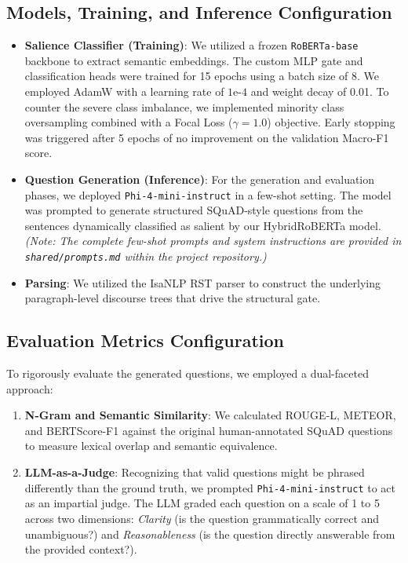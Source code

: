 \documentclass[11pt,a4paper]{article}
\begin{document}
\subsection{Models, Training, and Inference Configuration}
\begin{itemize}
    \item \textbf{Salience Classifier (Training)}: We utilized a frozen \texttt{RoBERTa-base} backbone to extract semantic embeddings. The custom MLP gate and classification heads were trained for 15 epochs using a batch size of 8. We employed AdamW with a learning rate of $1\text{e-}4$ and weight decay of 0.01. To counter the severe class imbalance, we implemented minority class oversampling combined with a Focal Loss ($\gamma=1.0$) objective. Early stopping was triggered after 5 epochs of no improvement on the validation Macro-F1 score.
    \item \textbf{Question Generation (Inference)}: For the generation and evaluation phases, we deployed \texttt{Phi-4-mini-instruct} in a few-shot setting. The model was prompted to generate structured SQuAD-style questions from the sentences dynamically classified as salient by our HybridRoBERTa model. \textit{(Note: The complete few-shot prompts and system instructions are provided in \texttt{shared/prompts.md} within the project repository.)}
    \item \textbf{Parsing}: We utilized the IsaNLP RST parser to construct the underlying paragraph-level discourse trees that drive the structural gate.
\end{itemize}

\subsection{Evaluation Metrics Configuration}
To rigorously evaluate the generated questions, we employed a dual-faceted approach:
\begin{enumerate}
    \item \textbf{N-Gram and Semantic Similarity}: We calculated ROUGE-L, METEOR, and BERTScore-F1 against the original human-annotated SQuAD questions to measure lexical overlap and semantic equivalence.
    \item \textbf{LLM-as-a-Judge}: Recognizing that valid questions might be phrased differently than the ground truth, we prompted \texttt{Phi-4-mini-instruct} to act as an impartial judge. The LLM graded each question on a scale of 1 to 5 across two dimensions: \textit{Clarity} (is the question grammatically correct and unambiguous?) and \textit{Reasonableness} (is the question directly answerable from the provided context?).
\end{enumerate}
\end{document}
